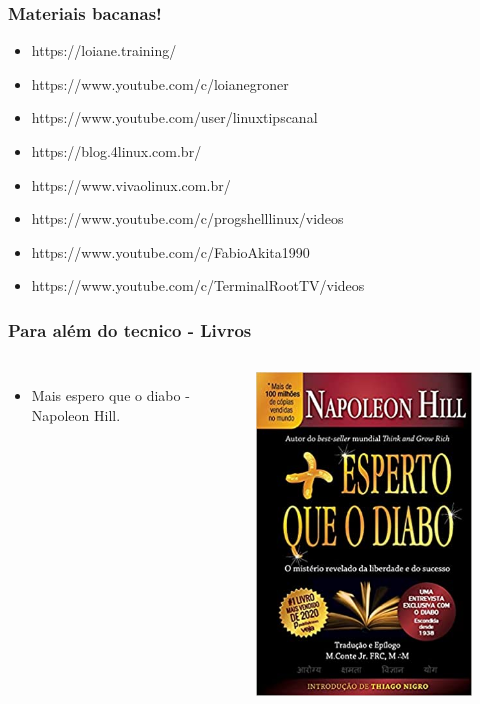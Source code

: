 \documentclass[    
  12pt, 
  compress,
  aspectratio=169,
  blue
  ]{beamer}
\begin{document}
\begin{frame}
\frametitle{ Materiais bacanas!}   

\begin{itemize}
\item<1-> https://loiane.training/
\item<2->https://www.youtube.com/c/loianegroner
\item<3->https://www.youtube.com/user/linuxtipscanal
\item<4->https://blog.4linux.com.br/
\item<5->https://www.vivaolinux.com.br/
\item<6->https://www.youtube.com/c/progshelllinux/videos
\item<7->https://www.youtube.com/c/FabioAkita1990
\item<8->https://www.youtube.com/c/TerminalRootTV/videos


\end{itemize}

\end{frame}
\begin{frame}
\frametitle{ Para além do tecnico - Livros}   
\begin{columns}[c]
\begin{itemize}
\item<1-> Mais espero que o diabo - Napoleon Hill.
\end{itemize}
\centering
\begin{figure}
\includegraphics[scale=0.3]{diabo}
\end{figure}
\end{columns}
\end{frame}
\end{document}
